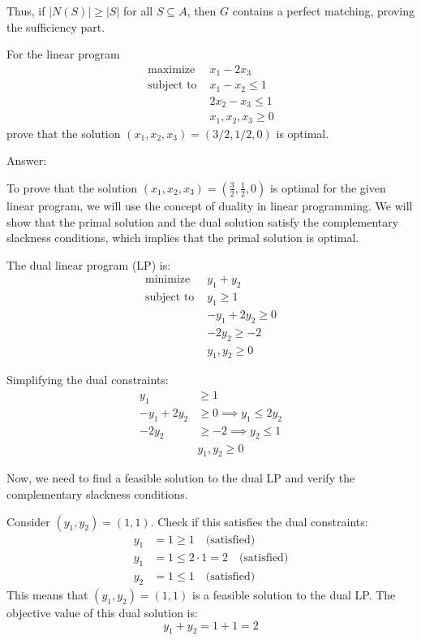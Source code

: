\documentclass{oxmathproblems}
\begin{document}
\begin{questions}
Thus, if \( |N(S)| \geq |S| \) for all \( S \subseteq A \), then \( G \) contains a perfect matching, proving the sufficiency part.

\miquestion[25]
For the linear program
\begin{align*}
\text{maximize }& x_1-2x_3 \\
\text{subject to }&x_1-x_2\leq1\\
&2x_2-x_3\leq1\\
&x_1,x_2,x_3\geq0
\end{align*}
prove that the solution $(x_1,x_2,x_3)=(3/2,1/2,0)$ is optimal.

Answer:

To prove that the solution \((x_1, x_2, x_3) = \left(\frac{3}{2}, \frac{1}{2}, 0\right)\) is optimal for the given linear program, we will use the concept of duality in linear programming. We will show that the primal solution and the dual solution satisfy the complementary slackness conditions, which implies that the primal solution is optimal.

The dual linear program (LP) is:
\[
\begin{align*}
\text{minimize } & y_1 + y_2 \\
\text{subject to } & y_1 \geq 1 \\
& -y_1 + 2y_2 \geq 0 \\
& -2y_2 \geq -2 \\
& y_1, y_2 \geq 0
\end{align*}
\]

Simplifying the dual constraints:
\[
\begin{align*}
y_1 & \geq 1 \\
-y_1 + 2y_2 & \geq 0 \implies y_1 \leq 2y_2 \\
-2y_2 & \geq -2 \implies y_2 \leq 1 \\
& y_1, y_2 \geq 0
\end{align*}
\]

Now, we need to find a feasible solution to the dual LP and verify the complementary slackness conditions.

Consider \( (y_1, y_2) = (1, 1) \). Check if this satisfies the dual constraints:
\[
\begin{align*}
y_1 & = 1 \geq 1 \quad \text{(satisfied)} \\
y_1 & = 1 \leq 2 \cdot 1 = 2 \quad \text{(satisfied)} \\
y_2 & = 1 \leq 1 \quad \text{(satisfied)}
\end{align*}
\]
\newpage
This means that \( (y_1, y_2) = (1, 1) \) is a feasible solution to the dual LP. The objective value of this dual solution is:
\[
y_1 + y_2 = 1 + 1 = 2
\]


\end{questions}
\end{document}
